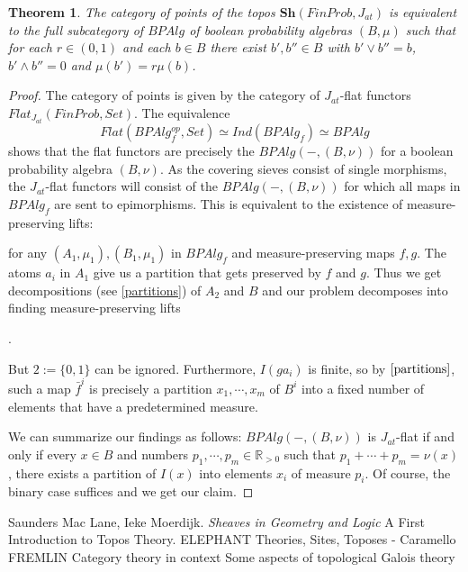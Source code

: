 \documentclass[a4paper]{amsproc}
\theoremstyle{plain}
\newtheorem{theorem}{Theorem}[section]
\theoremstyle{definition}
\theoremstyle{remark}
\numberwithin{equation}{section}
\begin{document}
\begin{theorem} The category of points of the topos $\textbf{Sh}(FinProb,J_{at})$ is equivalent to the full subcategory of $BPAlg$ of boolean probability algebras $(B,\mu)$ such that for each $r\in (0,1)$ and each $b\in B$ there exist $b', b''\in B$ with $b'\vee b''=b$, $b'\wedge b''=0$ and $\mu(b')=r\mu(b)$.\end{theorem}
\begin{proof} The category of points is given by the category of $J_{at}$-flat functors $Flat_{J_{at}}(FinProb, Set)$.  The equivalence 
\[
Flat(BPAlg_f^{op}, Set) \simeq Ind(BPAlg_f) \simeq BPAlg
\]
shows that the flat functors are precisely the $BPAlg(-,(B,\nu))$ for a boolean probability algebra $(B,\nu)$. As the covering sieves consist of single morphisms, the $J_{at}$-flat functors will consist of the $BPAlg(-,(B,\nu))$ for which all maps in $BPAlg_f$ are sent to epimorphisms. This is equivalent to the existence of measure-preserving lifts:
\begin{center}
\end{center}
for any $(A_1,\mu_1), (B_1,\mu_1)$ in $BPAlg_f$ and measure-preserving maps $f,g$. The atoms $a_i$ in $A_1$ give us a partition that gets preserved by $f$ and $g$. Thus we get decompositions (see \ref{partitions}) of $A_2$ and $B$ and our problem decomposes into finding measure-preserving lifts

\begin{center}
.
\end{center}
But $2 := \{0, 1\}$ can be ignored. Furthermore, $I(g a_i)$ is finite, so by $\ref{partitions}$, such a map $\bar{f}^i$ is precisely a partition $x_1, \cdots, x_m$ of $B^i$ into a fixed number of elements that have a predetermined measure.

We can summarize our findings as follows: $BPAlg(-, (B,\nu))$ is $J_{at}$-flat if and only if every $x \in B$ and numbers $p_1, \cdots, p_m \in \mathbb{R}_{>0}$ such that $p_1 + \cdots + p_m = \nu(x)$, there exists a partition of $I(x)$ into elements $x_i$ of measure $p_i$. Of course, the binary case suffices and we get our claim.
\end{proof}


\begin{thebibliography}{9}
Saunders Mac Lane, Ieke Moerdijk. \textit{Sheaves in Geometry and Logic} A First Introduction to Topos Theory.
ELEPHANT
Theories, Sites, Toposes - Caramello
FREMLIN
Category theory in context
Some aspects of topological Galois theory
\end{thebibliography}
\end{document}
